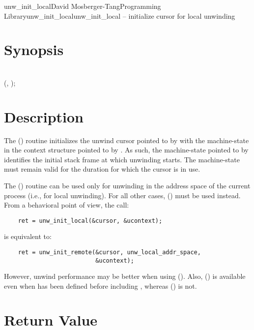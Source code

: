 \documentclass{article}
\begin{document}
\begin{Name}{3}{unw\_init\_local}{David Mosberger-Tang}{Programming Library}{unw\_init\_local}unw\_init\_local -- initialize cursor for local unwinding
\end{Name}

\section{Synopsis}

\\

 (, );\\

\section{Description}

The () routine initializes the unwind cursor
pointed to by  with the machine-state in the context structure
pointed to by .  As such, the machine-state pointed to by
 identifies the initial stack frame at which unwinding
starts.  The machine-state must remain valid for the duration for
which the cursor  is in use.

The () routine can be used only for unwinding in
the address space of the current process (i.e., for local unwinding).
For all other cases, () must be used instead.
From a behavioral point of view, the call:

\begin{verbatim}
    ret = unw_init_local(&cursor, &ucontext);
\end{verbatim}
is equivalent to:

\begin{verbatim}
    ret = unw_init_remote(&cursor, unw_local_addr_space,
                          &ucontext);
\end{verbatim}
However, unwind performance may be better when using
().  Also, () is
available even when  has been defined before
including , whereas ()
is not.

\section{Return Value}
\end{document}
